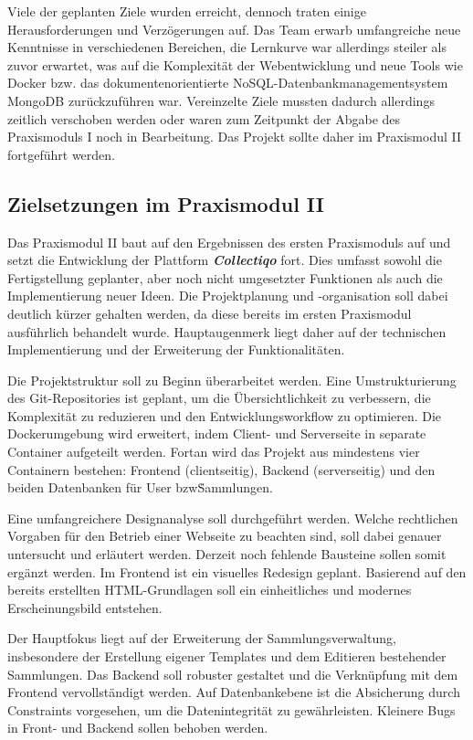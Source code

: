 Viele der geplanten Ziele wurden erreicht, dennoch traten einige Herausforderungen und Verzögerungen auf.
Das Team erwarb umfangreiche neue Kenntnisse in verschiedenen Bereichen, die Lernkurve war allerdings steiler als zuvor erwartet, was auf die Komplexität der Webentwicklung und neue Tools wie Docker bzw. das dokumentenorientierte NoSQL-Datenbankmanagementsystem MongoDB zurückzuführen war.
Vereinzelte Ziele mussten dadurch allerdings zeitlich verschoben werden oder waren zum Zeitpunkt der Abgabe des Praxismoduls I noch in Bearbeitung.
Das Projekt sollte daher im Praxismodul II fortgeführt werden.

\newpage

\subsection{Zielsetzungen im Praxismodul II}\label{subsec:subsection-one-two}

Das Praxismodul II baut auf den Ergebnissen des ersten Praxismoduls auf und setzt die Entwicklung der Plattform \textbf{\textit{Collectiqo}} fort.
Dies umfasst sowohl die Fertigstellung geplanter, aber noch nicht umgesetzter Funktionen als auch die Implementierung neuer Ideen.
Die Projektplanung und -organisation soll dabei deutlich kürzer gehalten werden, da diese bereits im ersten Praxismodul ausführlich behandelt wurde.
Hauptaugenmerk liegt daher auf der technischen Implementierung und der Erweiterung der Funktionalitäten.

Die Projektstruktur soll zu Beginn überarbeitet werden.
Eine Umstrukturierung des Git-Repositories ist geplant, um die Übersichtlichkeit zu verbessern, die Komplexität zu reduzieren und den Entwicklungsworkflow zu optimieren.
Die Dockerumgebung wird erweitert, indem Client- und Serverseite in separate Container aufgeteilt werden.
Fortan wird das Projekt aus mindestens vier Containern bestehen: Frontend (clientseitig), Backend (serverseitig) und den beiden Datenbanken für User bzw\. Sammlungen.

Eine umfangreichere Designanalyse soll durchgeführt werden.
Welche rechtlichen Vorgaben für den Betrieb einer Webseite zu beachten sind, soll dabei genauer untersucht und erläutert werden.
Derzeit noch fehlende Bausteine sollen somit ergänzt werden.
Im Frontend ist ein visuelles Redesign geplant.
Basierend auf den bereits erstellten HTML-Grundlagen soll ein einheitliches und modernes Erscheinungsbild entstehen.

Der Hauptfokus liegt auf der Erweiterung der Sammlungsverwaltung, insbesondere der Erstellung eigener Templates und dem Editieren bestehender Sammlungen.
Das Backend soll robuster gestaltet und die Verknüpfung mit dem Frontend vervollständigt werden.
Auf Datenbankebene ist die Absicherung durch Constraints vorgesehen, um die Datenintegrität zu gewährleisten.
Kleinere Bugs in Front- und Backend sollen behoben werden.


